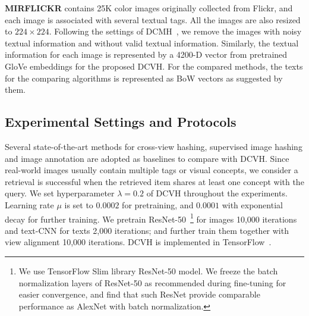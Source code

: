 \documentclass[10pt,twocolumn,letterpaper]{article}
\begin{document}
\textbf{MIRFLICKR} contains 25K color images originally collected from Flickr, and each image is associated with several textual tags. All the images are also resized to $224\times 224$. Following the settings of DCMH~\cite{dcmh}, we remove the images with noisy textual information and without valid textual information. Similarly, the textual information for each image is represented by a 4200-D vector from pretrained GloVe embeddings for the proposed DCVH. For the compared methods, the texts for the comparing algorithms is represented as BoW vectors as suggested by them.

\subsection{Experimental Settings and Protocols}
Several state-of-the-art methods for cross-view hashing, supervised image hashing and image annotation are adopted as baselines to compare with DCVH. Since real-world images usually contain multiple tags or visual concepts, we consider a retrieval is successful when the retrieved item shares at least one concept with the query. We set hyperparameter $\lambda=0.2$ of DCVH throughout the experiments. Learning rate $\mu$ is set to $0.0002$ for pretraining, and $0.0001$ with exponential decay for further training. We pretrain ResNet-50~\footnote{We use TensorFlow Slim library ResNet-50 model. We freeze the batch normalization layers of ResNet-50 as recommended during fine-tuning for easier convergence, and find that such ResNet provide comparable performance as AlexNet with batch normalization.} for images 10,000 iterations and text-CNN for texts 2,000 iterations; and further train them together with view alignment 10,000 iterations. DCVH is implemented in TensorFlow~\cite{45166}.
\end{document}
